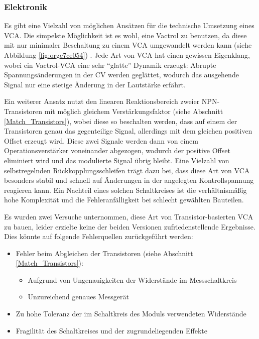\subsubsection{Elektronik}
\label{sec:org432facc}
Es gibt eine Vielzahl von möglichen Ansätzen für die technische Umsetzung eines \ac{VCA}. Die simpelste Möglichkeit ist es wohl, eine Vactrol zu benutzen, da diese mit nur minimaler Beschaltung zu einem VCA umgewandelt werden kann (siehe Abbildung \ref{fig:orge7ce054}) \cite{miaw:vca}. Jede Art von \ac{VCA} hat einen gewissen Eigenklang, wobei ein Vactrol-VCA eine sehr "`glatte"' Dynamik erzeugt: Abrupte Spannungsänderungen in der \acl{CV} werden geglättet, wodurch das ausgehende Signal nur eine stetige Änderung in der Lautstärke erfährt.

Ein weiterer Ansatz nutzt den linearen Reaktionsbereich zweier NPN-Transistoren mit möglich gleichem Verstärkungsfaktor (siehe Abschnitt \ref{Match_Transistors}), wobei diese so beschalten werden, dass auf einem der Transistoren genau das gegenteilige Signal, allerdings mit dem gleichen positiven Offset erzeugt wird. Diese zwei Signale werden dann von einem Operationsverstärker voneinander abgezogen, wodurch der positive Offset eliminiert wird und das modulierte Signal übrig bleibt. Eine Vielzahl von selbstregelnden Rückkopplungsschleifen trägt dazu bei, dass diese Art von \ac{VCA} besonders stabil und schnell auf Änderungen in der angelegten Kontrollspannung reagieren kann. Ein Nachteil eines solchen Schaltkreises ist die verhältnismäßig hohe Komplexität und die Fehleranfälligkeit bei schlecht gewählten Bauteilen.

Es wurden zwei Versuche unternommen, diese Art von Transistor-basierten VCA \cite{klein:vca} zu bauen, leider erzielte keine der beiden Versionen zufriedenstellende Ergebnisse. Dies könnte auf folgende Fehlerquellen zurückgeführt werden:
\begin{itemize}
\item Fehler beim Abgleichen der Transistoren (siehe Abschnitt \ref{Match_Transistors}):
\begin{itemize}
\item Aufgrund von Ungenauigkeiten der Widerstände im Messschaltkreis
\item Unzureichend genaues Messgerät
\end{itemize}
\item Zu hohe Toleranz der im Schaltkreis des Moduls verwendeten Widerstände
\item Fragilität des Schaltkreises und der zugrundeliegenden Effekte
\end{itemize}

